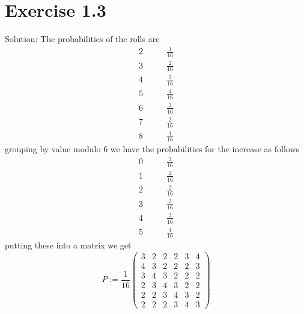 \documentclass[11pt]{article}
\newcommand{\solution}[1]{{{\textcolor{header}{Solution:} \textcolor{solution}{#1}}}}
\begin{document}
\section{Exercise 1.3}
\solution{
    The probabilities of the rolls are
    \begin{align*}
        2 & \qquad\frac{1}{16}\\
        3 & \qquad\frac{2}{16}\\
        4 & \qquad\frac{3}{16}\\
        5 & \qquad\frac{4}{16}\\
        6 & \qquad\frac{3}{16}\\
        7 & \qquad\frac{2}{16}\\
        8 & \qquad\frac{1}{16}
    \end{align*}
    grouping by value modulo 6 we have the probabilities for the increase as follows
    \begin{align*}
        0 & \qquad\frac{3}{16}\\
        1 & \qquad\frac{2}{16}\\
        2 & \qquad\frac{2}{16}\\
        3 & \qquad\frac{2}{16}\\
        4 & \qquad\frac{3}{16}\\
        5 & \qquad\frac{4}{16}
    \end{align*}
    putting these into a matrix we get
    \[
    P := \frac{1}{16}
    \begin{pmatrix} 
        3 & 2 & 2 & 2 & 3 & 4\\
        4 & 3 & 2 & 2 & 2 & 3\\
        3 & 4 & 3 & 2 & 2 & 2\\
        2 & 3 & 4 & 3 & 2 & 2\\
        2 & 2 & 3 & 4 & 3 & 2\\
        2 & 2 & 2 & 3 & 4 & 3
    \end{pmatrix} 
    \] 
}
\end{document}
